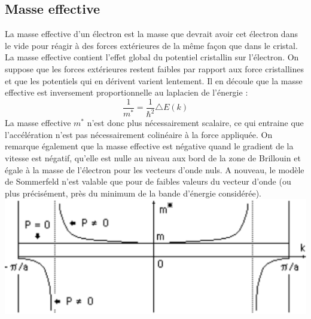 \subsection{Masse effective}
La masse effective d'un électron est la masse que devrait avoir cet électron dans le vide pour réagir à des forces extérieures de la même façon que dans le cristal. La masse effective contient l'effet global du potentiel cristallin sur l'électron. On suppose que les forces extérieures restent faibles par rapport aux force cristallines et que les potentiels qui en dérivent varient lentement. Il en découle que la masse effective est inversement proportionnelle au laplacien de l'énergie :
\begin{equation}
\frac{1}{m^*}=\frac{1}{\hbar^2} \triangle E(k)
\end{equation}
La masse effective $m^*$ n'est donc plus nécessairement scalaire, ce qui entraine que l'accélération n'est pas nécessairement colinéaire à la force appliquée. On remarque également que la masse effective est négative quand le gradient de la vitesse est négatif, qu'elle est nulle au niveau aux bord de la zone de Brillouin et égale à la masse de l'électron pour les vecteurs d'onde nuls. A nouveau, le modèle de Sommerfeld n'est valable que pour de faibles valeurs du vecteur d'onde (ou plus précisément, près du minimum de la bande d'énergie considérée).
\\\includegraphics[scale=0.4]{masse.eps}
